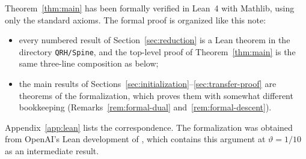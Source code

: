 Theorem~\ref{thm:main} has been formally verified in Lean~4 with Mathlib, using only the
standard axioms. The formal proof is organized like this note:
\begin{itemize}
\item every numbered result of Section~\ref{sec:reduction} is a Lean theorem in the directory
\texttt{QRH/Spine}, and the top-level proof of Theorem~\ref{thm:main} is the same three-line
composition as below;
\item the main results of Sections~\ref{sec:initialization}--\ref{sec:transfer-proof} are
theorems of the formalization, which proves them with somewhat different bookkeeping
(Remarks~\ref{rem:formal-dual} and~\ref{rem:formal-descent}).
\end{itemize}
Appendix~\ref{app:lean} lists the correspondence. The formalization was obtained from OpenAI's
Lean development of \cite{OpenAI26}, which contains this argument at $\vartheta=1/10$ as an
intermediate result.

